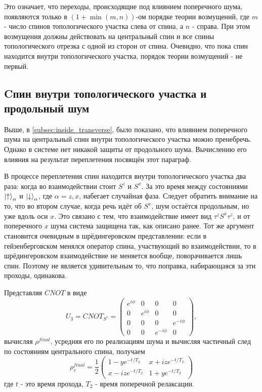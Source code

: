 \documentclass[a4paper,12pt]{article}
\theoremstyle{plain} %
\theoremstyle{definition} %
\theoremstyle{remark} %
\begin{document}
Это означает, что переходы, происходящие под влиянием поперечного шума, появляются только в $(1 + \min(m,n))$-ом порядке теории возмущений, где $m$ - число спинов топологического участка слева от спина, а $n$ - справа. 
При этом возмущения должны действовать на центральный спин и все спины топологического отрезка с одной из сторон от спина.
Очевидно, что пока спин находится внутри топологического участка, порядок теории возмущений - не первый.

\subsection{Cпин внутри топологического участка и продольный шум}

Выше, в \ref{subsec:inside_transverse}, было показано, что влиянием поперечного шума на центральный спин внутри топологического участка можно пренебречь. Однако в системе нет никакой защиты от продольного шума. Вычислению его влияния на результат переплетения посвящён этот параграф.

В процессе переплетения спин находится внутри топологического участка два раза: когда во взаимодействии стоит $S^z$ и $S^x$.
За это время между состояниями $\ket{\uparrow}_\alpha$ и $\ket{\downarrow}_\alpha$, где $\alpha = z, x$, набегает случайная фаза.
Следует обратить внимание на то, что во втором случае, когда речь идёт об $S^x$, шум остаётся продольным, но уже вдоль оси $x$. 
Это связано с тем, что взаимодействие имеет вид $\tau^z S^x \tau^z$, и от поперечного $x$ шума система защищена так, как описано ранее. 
Тот же аргумент становится очевидным в шрёдингеровском представлении: если в гейзенберговском менялся оператор спина, участвующий во взаимодействии, то в шрёдингеровском взаимодействие не меняется вообще, поворачивается лишь спин.
Поэтому не является удивительным то, что поправка, набирающаяся за эти проходы, одинакова.

Представляя $CNOT$ в виде
\begin{equation}
U_3 = CNOT_{S^z} = 
\begin{pmatrix}
e^{i \phi} & 0 & 0 & 0 \\
0 & e^{i \phi} & 0 & 0 \\
0 & 0 & 0 & e^{-i \phi} \\
0 & 0 & e^{-i \phi} & 0
\end{pmatrix},
\end{equation}
вычисляя $\rho^{final}$, усредняя его по реализациям шума и вычисляя частичный след по состояниям центрального спина, получаем
\begin{equation}
\rho^{final}_\tau = \frac{1}{2}
\begin{pmatrix}
1 - y e^{-t/T_2} & x + i z e^{-t/T_2} \\
x - i z e^{-t/T_2} & 1 + y e^{-t/T_2}
\end{pmatrix}
\end{equation}
где $t$ - это время прохода, $T_2$ - время поперечной релаксации. 
\end{document}
